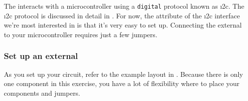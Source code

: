 The  interacts with a microcontroller using a \texttt{digital} protocol known as \i2c. 
The \i2c protocol is discussed in detail in .
For now, the attribute of the \i2c interface we're most interested in is that it's very easy to set up. 
Connecting the  external \rtc to your microcontroller requires just a few jumpers. 


\subsubsection{\howto Set up an external \rtc}
As you set up your circuit, refer to the example layout in . 
Because there is only one component in this exercise, you have a lot of flexibility where to place your components and jumpers.
\begin{marginfigure}
	\begin{center}

\end{center}
\end{marginfigure}

